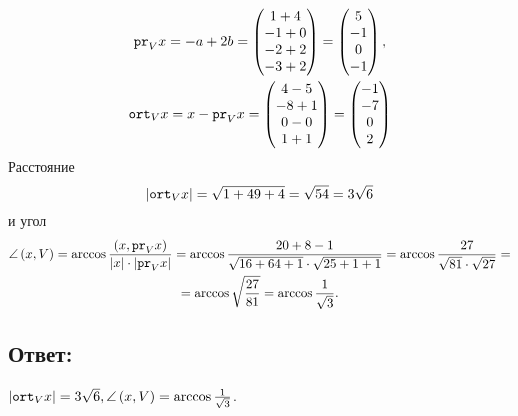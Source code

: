 \documentclass[12pt]{article}
\begin{document}
    \begin{gather*}
        \texttt{pr}_{V} {x}
        = -a + 2 b
        =
        \begin{pmatrix}
            1 + 4  \\
            -1 + 0 \\
            -2 + 2 \\
            -3 + 2
        \end{pmatrix}
        =
        \begin{pmatrix}
            5  \\
            -1 \\
            0  \\
            -1
        \end{pmatrix}, \\
        \texttt{ort}_{V} {x}
        = x - \texttt{pr}_{V} {x}
        =
        \begin{pmatrix}
            4 - 5  \\
            -8 + 1 \\
            0 - 0  \\
            1 + 1
        \end{pmatrix}
        =
        \begin{pmatrix}
            -1 \\
            -7 \\
            0  \\
            2
        \end{pmatrix}
    \end{gather*}
    Расстояние
    \[
        \left | \texttt{ort}_{V} {x} \right |
        = \sqrt{1 + 49 + 4}
        = \sqrt{54}
        = 3 \sqrt{6}
    \]
    и угол
    \begin{multline*}
        \angle \left ( x, V \right )
        = \arccos \frac{\left ( x, \texttt{pr}_{V} {x} \right )}{\left | x \right | \cdot \left | \texttt{pr}_{V} {x} \right |}
        = \arccos \frac{20 + 8 - 1}{\sqrt{16 + 64 + 1} \cdot \sqrt{25 + 1 + 1}}
        = \arccos \frac{27}{\sqrt{81} \cdot \sqrt{27}} = \\
        = \arccos \sqrt{\frac{27}{81}}
        = \arccos \frac{1}{\sqrt{3}}.
    \end{multline*}

    \subsection*{Ответ:}
    $\left | \texttt{ort}_{V} {x} \right | = 3 \sqrt{6}, \angle \left ( x, V \right ) = \arccos \frac{1}{\sqrt{3}}$.
\end{document}
